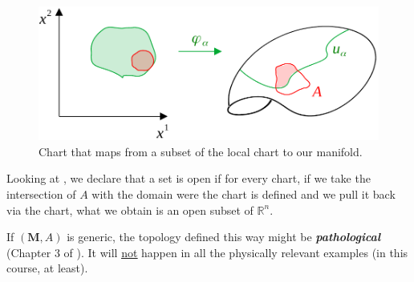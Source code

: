 \documentclass[../main.tex]{subfiles}
\begin{document}
\begin{figure}[H]
	\includegraphics{images/top_space.pdf}
	\caption{Chart that maps from a subset of the local chart to our manifold.}
\end{figure}
Looking at , we declare that a set is open if for every chart, if we take the intersection of $A$ with the domain were the chart is defined and we pull it back via the chart, what we obtain is an open subset of $\mathbb{R}^n$.
\begin{kaobox}[frametitle=Remark]
If $(\mathbf{M}, A)$ is generic, the topology defined this way might be \textbf{\textit{pathological}} (Chapter 3 of ). It will \underline{\underline{not}} happen in all the physically relevant examples (in this course, at least).
\end{kaobox}
\end{document}
